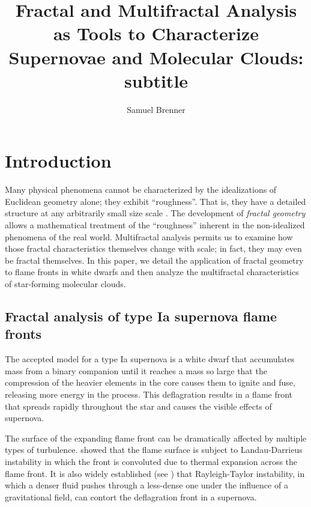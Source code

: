 \documentclass[iop]{emulateapj}
\begin{document}
%
\title{Fractal and Multifractal Analysis as Tools to Characterize Supernovae and Molecular Clouds: \\
subtitle}
%
\author{Samuel Brenner}
%
%
%
%
%
\begin{abstract}
\end{abstract}
%
%
%
%
%
%

\section{Introduction}
Many physical phenomena cannot be characterized by the idealizations of Euclidean geometry alone; they exhibit ``roughness''. That is, they have a detailed structure at any arbitrarily small size scale \citep{Falconer2003}. The development of \textit{fractal geometry} allows a mathematical treatment of the ``roughness'' inherent in the non-idealized phenomena of the real world. Multifractal analysis permits us to examine how those fractal characteristics themselves change with scale; in fact, they may even be fractal themselves. In this paper, we detail the application of fractal geometry to flame fronts in white dwarfs and then analyze the multifractal characteristics of star-forming molecular clouds.

\subsection{Fractal analysis of type Ia supernova flame fronts}
The accepted model for a type Ia supernova is a white dwarf that accumulates mass from a binary companion until it reaches a mass so large that the compression of the heavier elements in the core causes them to ignite and fuse, releasing more energy in the process. This deflagration results in a flame front that spreads rapidly throughout the star and causes the visible effects of supernova.

The surface of the expanding flame front can be dramatically affected by multiple types of turbulence. \cite{Landau1959} showed that the flame surface is subject to Landau-Darrieus instability in which the front is convoluted due to thermal expansion across the flame front. It is also widely established (see \cite{Kull1991}) that Rayleigh-Taylor instability, in which a denser fluid pushes through a less-dense one under the influence of a gravitational field, can contort the deflagration front in a supernova. 
\end{document}
